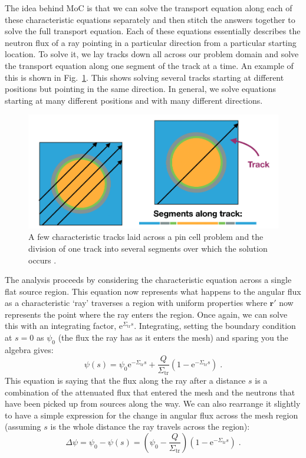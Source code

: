 \documentclass{article}
\begin{document}
The idea behind MoC is that we can solve the transport equation along each of these characteristic equations separately and then stitch the answers together to solve the full transport equation. Each of these equations essentially describes the neutron flux of a ray pointing in a particular direction from a particular starting location. To solve it, we lay tracks down all across our problem domain and solve the transport equation along one segment of the track at a time. An example of this is shown in Fig.~\ref{fig:track}. This shows solving several tracks starting at different positions but pointing in the same direction. In general, we solve equations starting at many different positions and with many different directions.

\begin{figure}[h]
    \centering
    \includegraphics[width=0.9\linewidth]{tracks_segments.png}
    \caption{A few characteristic tracks laid across a pin cell problem and the division of one track into several segments over which the solution occurs \cite{Gaston2021}.}
    \label{fig:track}
\end{figure}

The analysis proceeds by considering the characteristic equation across a single flat source region. This equation now represents what happens to the angular flux as a characteristic `ray' traverses a region with uniform properties where $\mathbf{r}'$ now represents the point where the ray enters the region. Once again, we can solve this with an integrating factor, $\mathrm{e}^{\Sigma_\mathrm{tr}s}$. Integrating, setting the boundary condition at $s=0$ as $\psi_0$ (the flux the ray has as it enters the mesh) and sparing you the algebra gives:
\begin{equation}
    \psi(s) = \psi_0\mathrm{e}^{-\Sigma_\mathrm{tr}s} + \frac{Q}{\Sigma_\mathrm{tr}}\left(1-\mathrm{e}^{-\Sigma_\mathrm{tr}s}\right)\;\mathrm{.}
\end{equation}
This equation is saying that the flux along the ray after a distance $s$ is a combination of the attenuated flux that entered the mesh and the neutrons that have been picked up from sources along the way. We can also rearrange it slightly to have a simple expression for the change in angular flux across the mesh region (assuming $s$ is the whole distance the ray travels across the region):
\begin{equation}\label{eq:delta}
	\Delta\psi = \psi_0 - \psi(s) = \left(\psi_0 - \frac{Q}{\Sigma_\mathrm{tr}}\right)\left(1-\mathrm{e}^{-\Sigma_\mathrm{tr}s}\right)\;\mathrm{.} 
\end{equation} 
\end{document}

